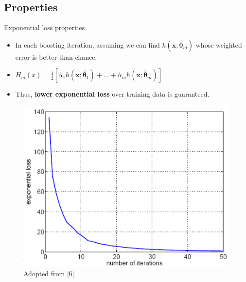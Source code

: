 \documentclass[serif, aspectratio=169]{beamer}
\begin{document}
\subsection{Properties}

\begin{frame}{Exponential loss properties}
    \begin{itemize}
        \itemsep1em
        \justifying
        \item In each boosting iteration, assuming we can find $h(\boldsymbol{x};\hat{\boldsymbol{\theta}}_m)$ whose weighted error is better than chance.
        \item[] \begin{center}
            $H_m(x) = \frac{1}{2}[\hat{\alpha}_1h(\boldsymbol{x};\hat{\boldsymbol{\theta}}_1)+ \dots + \hat{\alpha}_mh(\boldsymbol{x};\hat{\boldsymbol{\theta}}_m)]$
        \end{center}
        \item Thus, \textbf{lower exponential loss} over training data is guaranteed.
    \end{itemize}
    \vfill
    \begin{center}
        \begin{figure}
            \includegraphics[width=\textwidth]{pic/boosting_exploss.png}
            {\scriptsize Adopted from [6]}
        \end{figure}
        \endminipage
    \end{center}
\end{frame}
\end{document}
